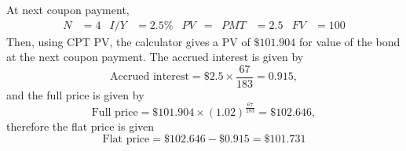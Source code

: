 \documentclass[../notes_compiled.tex]{subfiles}
\begin{document}
\begin{itemize}
{At next coupon payment, 
\begin{align*}
N&=4  & I / Y &= 2.5\%  & PV &= & PMT &=2.5 & FV &= 100
\end{align*}
Then, using CPT PV, the calculator gives a PV of $\$101.904$ for value of the bond at the next coupon payment. The accrued interest is given by
\begin{equation*}
\text{Accrued interest} = \$2.5 \times \frac{67}{183} = 0.915,
\end{equation*}
and the full price is given by
\begin{equation*}
\text{Full price} = \$101.904 \times (1.02)^{\frac{67}{183}} = \$102.646,
\end{equation*}
therefore the flat price is given
\begin{equation*}
\text{Flat price} = \$102.646 - \$0.915 = \$101.731
\end{equation*}
}
\end{itemize}
\end{document}
